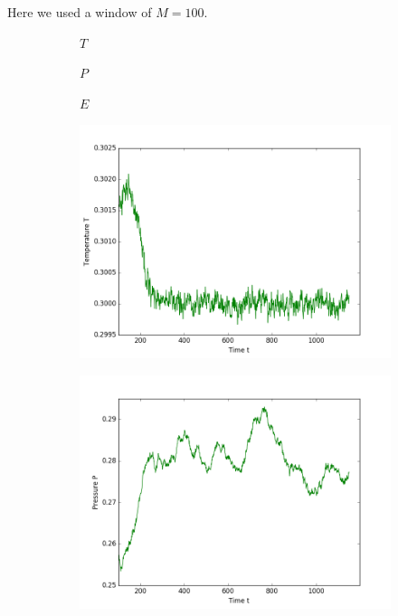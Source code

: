 Here we used a window of $M = 100$.
\begin{figure}[ht]
\hfill
\begin{subfigure}{0.3\textwidth}
\centering
$T$
\end{subfigure}
\hfill
\begin{subfigure}{0.3\textwidth}
\centering
$P$
\end{subfigure}
\hfill
\begin{subfigure}{0.3\textwidth}
\centering
$E$
\end{subfigure}

\begin{subfigure}{0.3\textwidth}
\includegraphics[width=\textwidth]{fig/avTemperature_T0d3_F20d0_M100.png}
\end{subfigure}
\hfill
\begin{subfigure}{0.3\textwidth}
\includegraphics[width=\textwidth]{fig/avPressure_T0d3_F20d0_M100.png}

\end{subfigure}
\end{figure}
